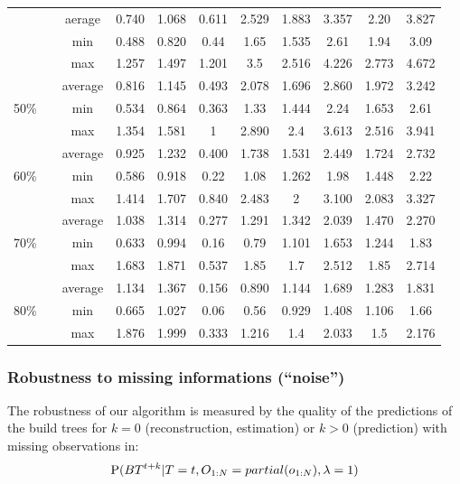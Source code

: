 \begin{table}[h]
\begin{center}
\begin{footnotesize}
\begin{tabular}{|c|c|cc|cc|cc|cc|}
& aerage & 0.740 & 1.068 & 0.611 & 2.529 & 1.883 & 3.357 & 2.20 & 3.827\\
& min & 0.488 & 0.820 & 0.44 & 1.65 & 1.535 & 2.61 & 1.94 & 3.09\\
& max & 1.257 & 1.497 & 1.201 & 3.5 & 2.516 & 4.226 & 2.773 & 4.672\\
\hline
\multirow{3}{3mm}{\begin{sideways}\parbox{3mm}{50\%\ \ }\end{sideways}}
& average & 0.816 & 1.145 & 0.493 & 2.078 & 1.696 & 2.860 & 1.972 & 3.242\\
& min & 0.534 & 0.864 & 0.363 & 1.33 & 1.444 & 2.24 & 1.653 & 2.61\\
& max & 1.354 & 1.581 & 1 & 2.890 & 2.4 & 3.613 & 2.516 & 3.941\\
\hline
\multirow{3}{3mm}{\begin{sideways}\parbox{3mm}{60\%\ \ }\end{sideways}}
& average & 0.925 & 1.232 & 0.400 & 1.738 & 1.531 & 2.449 & 1.724 & 2.732\\
& min & 0.586 & 0.918 & 0.22 & 1.08 & 1.262 & 1.98 & 1.448 & 2.22\\
& max & 1.414 & 1.707 & 0.840 & 2.483 & 2 & 3.100 & 2.083 & 3.327\\
\hline
\multirow{3}{3mm}{\begin{sideways}\parbox{3mm}{70\%\ \ }\end{sideways}}
& average & 1.038 & 1.314 & 0.277 & 1.291 & 1.342 & 2.039 & 1.470 & 2.270\\
& min & 0.633 & 0.994 & 0.16 & 0.79 & 1.101 & 1.653 & 1.244 & 1.83\\
& max & 1.683 & 1.871 & 0.537 & 1.85 & 1.7 & 2.512 & 1.85 & 2.714\\
\hline
\multirow{3}{3mm}{\begin{sideways}\parbox{3mm}{80\%\ \ }\end{sideways}}
& average & 1.134 & 1.367 & 0.156 & 0.890 & 1.144 & 1.689 & 1.283 & 1.831\\
& min & 0.665 & 1.027 & 0.06 & 0.56 & 0.929 & 1.408 & 1.106 & 1.66\\
& max & 1.876 & 1.999 & 0.333 & 1.216 & 1.4 & 2.033 & 1.5 & 2.176\\
\hline
\end{tabular}
\label{tab:buildtreeresults}
\end{footnotesize}
\end{center}
\end{table}


\subsubsection{Robustness to missing informations (``noise'')}
The robustness of our algorithm is measured by the quality of the predictions of the build trees for $k=0$ (reconstruction, estimation) or $k>0$ (prediction) with missing observations in:
$$ \mathrm{P}(BT^{t+k} | T=t, O_{1:N}=partial(o_{1:N}), \lambda = 1)$$

